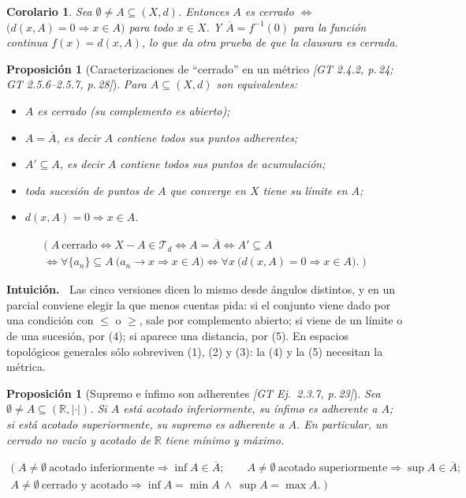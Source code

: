 \documentclass[11pt,a4paper]{article}
\newenvironment{intuicion}{\begin{cajaint}\small\textbf{Intuición.\ }}{\end{cajaint}}
\newenvironment{lista}{\leavevmode\begin{itemize}[leftmargin=1.5em,itemsep=1pt,topsep=2pt,parsep=0pt]}{\end{itemize}}
\newcommand{\lgc}[1]{\par\vspace{-3pt}\begin{gather*}\big(\;#1\;\big)\end{gather*}\vspace{-6pt}}
\theoremstyle{definition}
\theoremstyle{plain}
\newtheorem{proposicion}[definicion]{Proposición}
\newtheorem{corolario}[definicion]{Corolario}
\newcommand{\fnt}[1]{{\normalfont\small\itshape\color{gray!150!black}[#1]}}
\newcommand{\R}{\mathbb{R}}
\newcommand{\cl}[1]{\overline{#1}}
\newcommand{\tp}{\mathcal{T}}
\begin{document}
\begin{corolario}
Sea $\emptyset\ne A\subseteq(X,d)$. Entonces $A$ es cerrado $\iff$ $\big(d(x,A)=0\Rightarrow x\in A\big)$ para todo $x\in X$. Y $\cl A=f^{-1}(0)$ para la función continua $f(x)=d(x,A)$, lo que da otra prueba de que la clausura es cerrada.
\end{corolario}

\begin{proposicion}[Caracterizaciones de ``cerrado'' en un métrico \fnt{GT 2.4.2, p.\,24; GT 2.5.6--2.5.7, p.\,28}]
Para $A\subseteq(X,d)$ son equivalentes:
\begin{lista}
\item $A$ es cerrado (su complemento es abierto);
\item $A=\cl A$, es decir $A$ contiene todos sus puntos adherentes;
\item $A'\subseteq A$, es decir $A$ contiene todos sus puntos de acumulación;
\item toda sucesión de puntos de $A$ que converge en $X$ tiene su límite en $A$;
\item $d(x,A)=0\Rightarrow x\in A$.
\end{lista}
\lgc{A\ \text{cerrado}\iff X-A\in\tp_d\iff A=\cl A\iff A'\subseteq A\\
\iff \forall\{a_n\}\subseteq A\ \big(a_n\to x\Rightarrow x\in A\big)
\iff \forall x\ \big(d(x,A)=0\Rightarrow x\in A\big).}
\end{proposicion}

\begin{intuicion}
Las cinco versiones dicen lo mismo desde ángulos distintos, y en un parcial conviene elegir la que menos cuentas pida: si el conjunto viene dado por una condición con $\le$ o $\ge$, sale por complemento abierto; si viene de un límite o de una sucesión, por (4); si aparece una distancia, por (5). En espacios topológicos generales sólo sobreviven (1), (2) y (3): la (4) y la (5) necesitan la métrica.
\end{intuicion}

\begin{proposicion}[Supremo e ínfimo son adherentes \fnt{GT Ej.\ 2.3.7, p.\,23}]\label{hu:supadh}
Sea $\emptyset\ne A\subseteq(\R,|\cdot|)$. Si $A$ está acotado inferiormente, su ínfimo es adherente a $A$; si está acotado superiormente, su supremo es adherente a $A$. En particular, un cerrado no vacío y acotado de $\R$ tiene mínimo y máximo.
\lgc{A\ne\emptyset\ \text{acotado inferiormente}\Rightarrow \inf A\in\cl A;\qquad A\ne\emptyset\ \text{acotado superiormente}\Rightarrow \sup A\in\cl A;\\
A\ne\emptyset\ \text{cerrado y acotado}\Rightarrow \inf A=\min A\ \wedge\ \sup A=\max A.}
\end{proposicion}
\end{document}
